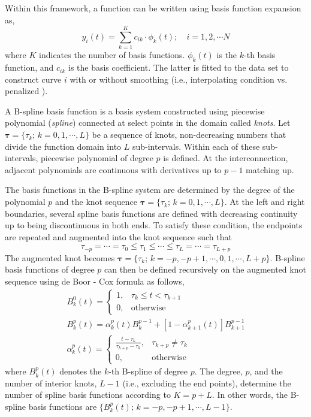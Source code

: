 Within this framework, a function can be written using basis function expansion as,
\begin{equation}
	y_i (t) = \sum_{k = 1}^{K} c_{ik} \cdot \phi_k (t); \quad i = 1, 2, \cdots N
\label{eq:basis_function_expansion}
\end{equation}
where $K$ indicates the number of basis functions. $\phi_k (t)$ is the $k$-th basis function, 
and $c_{ik}$ is the basis coefficient.
The latter is fitted to the data set to construct curve $i$ with or without smoothing (i.e., interpolating condition vs. penalized ).

A B-spline basis function is a basis system constructed using piecewise polynomial (\emph{spline}) connected at select points in the domain called \emph{knots}.
Let $\boldsymbol{\tau}=\{\tau_k; \, k = 0,1,\cdots, L\}$ be a sequence of knots, non-decreasing numbers that divide the function domain into $L$ sub-intervals.
Within each of these sub-intervals, piecewise polynomial of degree $p$ is defined.
At the interconnection, adjacent polynomials are continuous with derivatives up to $p-1$ matching up.

The basis functions in the B-spline system are determined by the degree of the polynomial $p$ and the knot sequence $\boldsymbol{\tau}=\{\tau_k; \, k = 0,1,\cdots, L\}$.
At the left and right boundaries, several spline basis functions are defined with decreasing continuity up to being discontinuous in both ends.
To satisfy these condition, the endpoints are repeated and augmented into the knot sequence such that
\begin{equation}
	\tau_{-p} = \cdots = \tau_{0} \leq \tau_{1} \leq \cdots \leq \tau_{L} = \cdots = \tau_{L+p} 
\label{eq:augmented_knots}
\end{equation}
The augmented knot becomes $\boldsymbol{\tau}=\{\tau_k; \, k = -p,-p+1,\cdots, 0, 1, \cdots, L + p\}$. 
B-spline basis functions of degree $p$ can then be defined recursively on the augmented knot sequence using de Boor - Cox formula as follows, 
\begin{equation}
	\begin{split}
		B^0_k (t) = 
			\begin{cases}
				1, & \tau_k \leq t < \tau_{k+1} \\
			0, & \text{otherwise}
	\end{cases} \\
	B^p_k (t) =  \alpha^p_k (t) B^{p-1}_k + \left[1 - \alpha^p_{k+1} (t)\right] B^{p-1}_{k+1} \\
	\alpha^p_k (t) =
	\begin{cases}
				\frac{t - \tau_k}{\tau_{k+p}-\tau_k}, & \tau_{k+p} \neq \tau_k \\
			  0, & \text{otherwise}
	\end{cases}
	\end{split} 
\label{eq:deboor_cox}
\end{equation}
where $B_k^p (t)$ denotes the $k$-th B-spline of degree $p$.
The degree, $p$, and the number of interior knots, $L-1$ (i.e., excluding the end points), 
determine the number of spline basis functions according to $K = p + L$.
In other words, the B-spline basis functions are $\{B_k^p (t); \, k = -p,-p+1,\cdots,L-1\}$.

